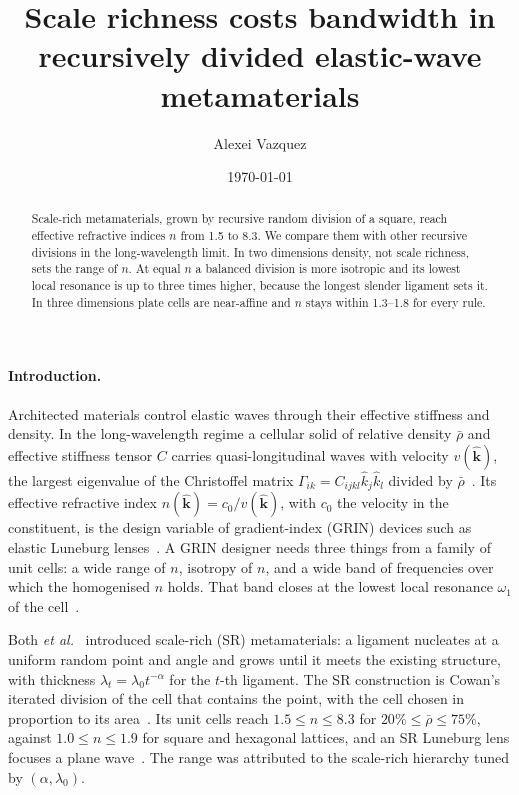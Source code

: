 \documentclass[aps,prl,twocolumn,superscriptaddress,amsmath,amssymb,floatfix]{revtex4-2}
\begin{document}
\title{Scale richness costs bandwidth in recursively divided elastic-wave metamaterials}

\author{Alexei Vazquez}

\date{\today}

\begin{abstract}
Scale-rich metamaterials, grown by recursive random division of a square, reach effective
refractive indices $n$ from 1.5 to 8.3. We compare them with other recursive divisions in
the long-wavelength limit. In two dimensions density, not scale richness, sets the range
of $n$. At equal $n$ a balanced division is more isotropic and its lowest local resonance
is up to three times higher, because the longest slender ligament sets it. In three
dimensions plate cells are near-affine and $n$ stays within 1.3--1.8 for every rule.
\end{abstract}

\maketitle

\paragraph*{Introduction.}
Architected materials control elastic waves through their effective stiffness and
density. In the long-wavelength regime a cellular solid of relative density $\bar\rho$
and effective stiffness tensor $C$ carries quasi-longitudinal waves with velocity
$v(\hat{\bm k})$, the largest eigenvalue of the Christoffel matrix
$\Gamma_{ik}=C_{ijkl}\hat k_j\hat k_l$ divided by $\bar\rho$~\cite{auld1973}. Its
effective refractive index $n(\hat{\bm k})=c_0/v(\hat{\bm k})$, with $c_0$ the
velocity in the constituent, is the design variable of gradient-index (GRIN) devices
such as elastic Luneburg lenses~\cite{tol2017}. A GRIN designer needs three things
from a family of unit cells: a wide range of $n$, isotropy of $n$, and a wide band of
frequencies over which the homogenised $n$ holds. That band closes at the lowest local
resonance $\omega_1$ of the cell~\cite{liu2000}.

Both \textit{et al.}~\cite{both2026} introduced scale-rich (SR) metamaterials: a ligament
nucleates at a uniform random point and angle and grows until it meets the existing
structure, with thickness $\lambda_t=\lambda_0t^{-\alpha}$ for the $t$-th ligament. The
SR construction is Cowan's iterated division of the cell that contains the point, with
the cell chosen in proportion to its area~\cite{cowan2010,vazquez2026sr}. Its unit cells
reach $1.5\le n\le8.3$ for $20\%\le\bar\rho\le75\%$, against $1.0\le n\le1.9$ for
square and hexagonal lattices, and an SR Luneburg lens focuses a plane
wave~\cite{both2026}. The range was attributed to the scale-rich hierarchy tuned by
$(\alpha,\lambda_0)$.
\end{document}
